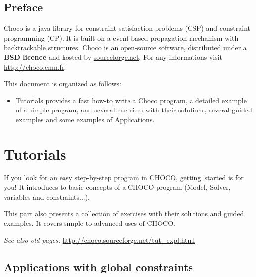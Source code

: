 \chapter*{Preface}
Choco is a java library for constraint satisfaction problems (CSP) and constraint programming (CP). It is built on a event-based propagation mechanism with backtrackable structures.
Choco is an open-source software, distributed under a \textbf{BSD licence} and hosted by \href{http://sourceforge.net/projects/choco/}{sourceforge.net}.
For any informations visit \url{http://choco.emn.fr}.
\bigskip

\noindent This document is organized as follows:
\begin{itemize}
\item \hyperlink{ch:tut}{Tutorials} provides a \hyperlink{gettingstarted:gettingstarted:welcometochoco}{fast how-to} write a Choco program, a detailed example of a \hyperlink{gettingstarted:firstexample:magicsquare}{simple program}, and several \hyperlink{exercises}{exercises} with their \hyperlink{solutions}{solutions},  several guided examples  and some examples of \hyperlink{doc:applications}{Applications}.
\end{itemize}

\part{Tutorials}\label{ch:tut}\hypertarget{ch:tut}{}
If you look for an easy step-by-step program in CHOCO, \hyperlink{gettingstarted}{getting\ started} is for you! It introduces to basic concepts of a CHOCO program (Model, Solver, variables and constraints...).

This part also presents a collection of \hyperlink{exercises}{exercises} with their \hyperlink{solutions}{solutions} and guided examples. It covers simple to advanced uses of CHOCO.

\emph{See also old pages:} \url{http://choco.sourceforge.net/tut\_expl.html}





\chapter{Applications with global constraints}\label{doc:applications}\hypertarget{doc:applications}{}

\pagebreak
